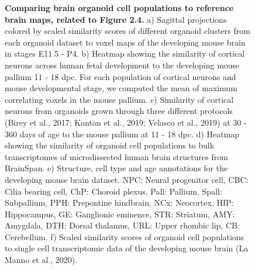 \begin{figure}[h!]
    \centering
    \caption{\textbf{Comparing brain organoid cell populations to reference brain maps, related to Figure 2.4.} a) Sagittal projections colored by scaled similarity scores of different organoid clusters from each organoid dataset to voxel maps of the developing mouse brain in stages E11.5 - P4. b) Heatmap showing the similarity of cortical neurons across human fetal development to the developing mouse pallium 11 - 18 dpc. For each population of cortical neurons and mouse developmental stage, we computed the mean of maximum correlating voxels in the mouse pallium. c) Similarity of cortical neurons from organoids grown through three different protocols (Birey et al., 2017; Kanton et al., 2019; Velasco et al., 2019) at 30 - 360 days of age to the mouse pallium at 11 - 18 dpc. d) Heatmap showing the similarity of organoid cell populations to bulk transcriptomes of microdissected human brain structures from BrainSpan. e) Structure, cell type and age annotations for the developing mouse brain dataset. NPC: Neural progenitor cell, CBC: Cilia bearing cell, ChP: Choroid plexus, Pall: Pallium, Spall: Subpallium, PPH: Prepontine hindbrain, NCx: Neocortex, HIP: Hippocampus, GE: Ganglionic eminence, STR: Striatum, AMY: Amygdala, DTH: Dorsal thalamus, URL: Upper rhombic lip, CB: Cerebellum. f) Scaled similarity scores of organoid cell populations to single cell transcriptomic data of the developing mouse brain (La Manno et al., 2020).}
\end{figure}

